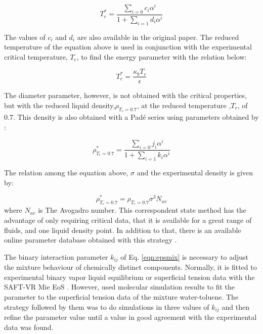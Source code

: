 \begin{equation}
T_{c}^{*} = \frac{\sum_{i=0} c_{i}\alpha^{i}}{1+\sum_{i=1} d_{i}\alpha^{i}}   
\label{eqn:tc}
\end{equation}

The values of $c_{i}$ and $d_{i}$ are also available in the original paper. The reduced temperature of the equation above is used in conjunction with the experimental critical temperature, $ T_{c}$, to find the energy parameter with the relation below:

\begin{equation}
T_{c}^{*} = \frac{\kappa_{b}T_{c}}{\epsilon}   
\label{eqn:epscorre}
\end{equation}

The diameter parameter, however, is not obtained with the critical properties, but with the reduced liquid density,$\rho_{T_{r}=0.7}$, at the reduced temperature ,$T_{r}$, of $0.7$. This density is also obtained with a Padé series using parameters obtained by :

\begin{equation}
\rho_{T_{r}=0.7}^{*} = \frac{\sum_{i=0} j_{i}\alpha^{i}}{1+\sum_{i=1} k_{i}\alpha^{i}} 
\label{eqn:denscorre}
\end{equation}

The relation among the equation above, $\sigma$ and the experimental density is given by:

\begin{equation}
\rho_{T_{r}=0.7}^{*} = \rho_{T_{r}=0.7}\sigma^{3}N_{av}   
\label{eqn:sigmacorre}
\end{equation}
where $N_{av}$ is The Avogadro number. This correspondent state method has the advantage of only requiring critical data, that it is available for a great range of fluids, and one liquid density point. In addition to that, there is an available online parameter database obtained with this strategy \cite{ervik2016}.     

The binary interaction parameter $k_{ij}$ of Eq. \eqref{eqn:epsmix} is necessary to adjust the mixture behaviour of chemically distinct components. Normally, it is fitted to experimental binary vapor liquid equilibrium or superficial tension data with the SAFT-VR Mie EoS \cite{muller2017,lobanova2016}. However,  used molecular simulation results to fit the parameter to the superficial tension data of the mixture water-toluene. The strategy followed by them was to do simulations in three values of $k_{ij}$ and then refine the parameter value until a value in good agreement with the experimental data was found. 

